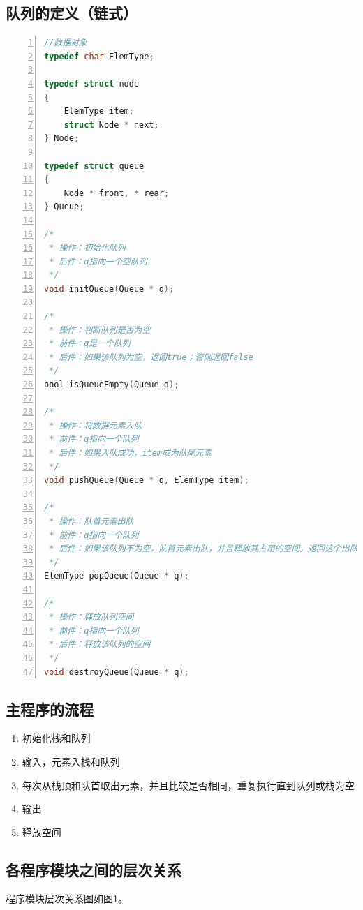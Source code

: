 \documentclass{article}
\begin{document}
\subsection{队列的定义（链式）}

\begin{lstlisting}[language={C},
    numbers=left,
    numberstyle=\tiny\consolas,
    basicstyle=\small\consolas]
//数据对象
typedef char ElemType;

typedef struct node
{
    ElemType item;
    struct Node * next;
} Node;

typedef struct queue
{
    Node * front, * rear;
} Queue;

/*
 * 操作：初始化队列
 * 后件：q指向一个空队列
 */
void initQueue(Queue * q);

/*
 * 操作：判断队列是否为空
 * 前件：q是一个队列
 * 后件：如果该队列为空，返回true；否则返回false
 */
bool isQueueEmpty(Queue q);

/*
 * 操作：将数据元素入队
 * 前件：q指向一个队列
 * 后件：如果入队成功，item成为队尾元素
 */
void pushQueue(Queue * q, ElemType item);

/*
 * 操作：队首元素出队
 * 前件：q指向一个队列
 * 后件：如果该队列不为空，队首元素出队，并且释放其占用的空间，返回这个出队的元素
 */
ElemType popQueue(Queue * q);

/*
 * 操作：释放队列空间
 * 前件：q指向一个队列
 * 后件：释放该队列的空间
 */
void destroyQueue(Queue * q);
\end{lstlisting}

\subsection{主程序的流程}

\begin{enumerate}
    \item 初始化栈和队列
    \item 输入，元素入栈和队列
    \item 每次从栈顶和队首取出元素，并且比较是否相同，重复执行直到队列或栈为空
    \item 输出
    \item 释放空间
\end{enumerate}

\subsection{各程序模块之间的层次关系}

程序模块层次关系图如图1。
\end{document}
